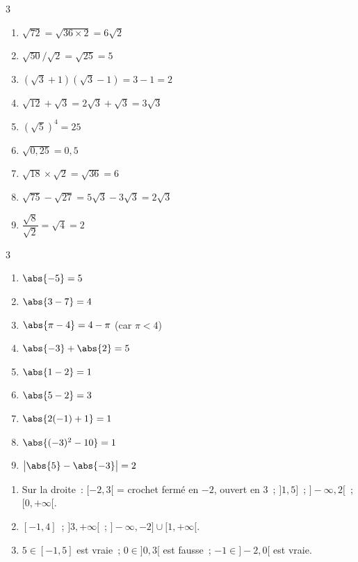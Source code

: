 
\begin{multicols}{3}
\begin{enumerate}
  \item $\sqrt{72}=\sqrt{36\times2}=6\sqrt{2}$
  \item $\sqrt{50}/\sqrt{2}=\sqrt{25}=5$
  \item $(\sqrt{3}+1)(\sqrt{3}-1)=3-1=2$
  \item $\sqrt{12}+\sqrt{3}=2\sqrt{3}+\sqrt{3}=3\sqrt{3}$
  \item $(\sqrt{5})^4=25$
  \item $\sqrt{0{,}25}=0{,}5$
  \item $\sqrt{18}\times\sqrt{2}=\sqrt{36}=6$
  \item $\sqrt{75}-\sqrt{27}=5\sqrt{3}-3\sqrt{3}=2\sqrt{3}$
  \item $\dfrac{\sqrt{8}}{\sqrt{2}}=\sqrt{4}=2$
\end{enumerate}
\end{multicols}


\begin{multicols}{3}
\begin{enumerate}
  \item $\abs{-5}=5$
  \item $\abs{3-7}=4$
  \item $\abs{\pi-4}=4-\pi$ (car $\pi<4$)
  \item $\abs{-3}+\abs{2}=5$
  \item $\abs{1-2}=1$
  \item $\abs{5-2}=3$
  \item $\abs{2(-1)+1}=1$
  \item $\abs{(-3)^2-10}=1$
  \item $\bigl|\abs{5}-\abs{-3}\bigr|=2$
\end{enumerate}
\end{multicols}


\begin{enumerate}
  \item Sur la droite~: $[-2,3[$ = crochet ferm\'e en $-2$, ouvert en $3$~; $]1,5]$~; $]-\infty,2[$~; $[0,+\infty[$.
  \item $[-1,4]$~; $]3,+\infty[$~; $]-\infty,-2]\cup[1,+\infty[$.
  \item $5\in[-1,5]$ est vraie~; $0\in]0,3[$ est fausse~;
        $-1\in]-2,0[$ est vraie.
\end{enumerate}

